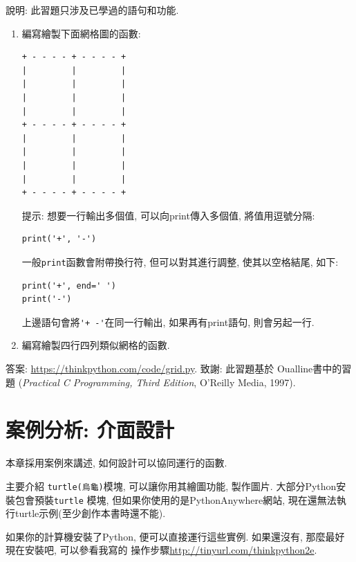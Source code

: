 \documentclass[10pt]{book}
\begin{document}
\begin{exercise}

說明: 此習題只涉及已學過的語句和功能. 

\begin{enumerate}

\item 編寫繪製下面網格圖的函數:

\begin{verbatim}
+ - - - - + - - - - +
|         |         |
|         |         |
|         |         |
|         |         |
+ - - - - + - - - - +
|         |         |
|         |         |
|         |         |
|         |         |
+ - - - - + - - - - +
\end{verbatim}
%
提示: 想要一行輸出多個值, 可以向print傳入多個值, 將值用逗號分隔:

\begin{verbatim}
print('+', '-')
\end{verbatim}
%
一般{\tt print}函數會附帶換行符, 但可以對其進行調整, 
使其以空格結尾, 如下:

\begin{verbatim}
print('+', end=' ')
print('-')
\end{verbatim}
%
上邊語句會將\verb"'+ -'"在同一行輸出, 如果再有print語句, 則會另起一行. 

\item 編寫繪製四行四列類似網格的函數. 

\end{enumerate}

答案: \url{https://thinkpython.com/code/grid.py}.
致謝: 此習題基於 Oualline書中的習題
({\em Practical C Programming, Third Edition},  
O'Reilly Media, 1997).

\end{exercise}


\chapter{案例分析: 介面設計}
\label{turtlechap}

本章採用案例來講述, 如何設計可以協同運行的函數. 

主要介紹 {\tt turtle(烏龜)}模塊, 可以讓你用其繪圖功能, 製作圖片. 
大部分Python安裝包會預裝{\tt turtle} 模塊, 但如果你使用的是PythonAnywhere網站, 
現在還無法執行turtle示例(至少創作本書時還不能). 

如果你的計算機安裝了Python,  便可以直接運行這些實例. 
如果還沒有, 那麼最好現在安裝吧, 可以參看我寫的
操作步驟\url{http://tinyurl.com/thinkpython2e}. 
\end{document}
